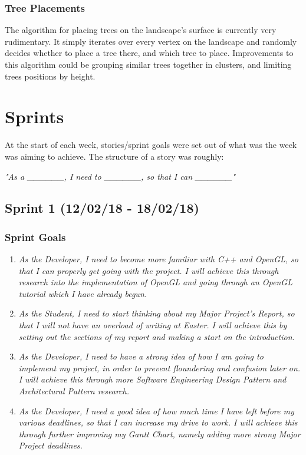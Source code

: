 \documentclass[a4paper,10pt]{report}
\begin{document}
\subsection{Tree Placements}
The algorithm for placing trees on the landscape's surface is currently very rudimentary. It simply iterates over every vertex on the landscape and randomly decides whether to place a tree there, and which tree to place. Improvements to this algorithm could be grouping similar trees together in clusters, and limiting trees positions by height. 



\chapter{Sprints}

At the start of each week, stories/sprint goals were set out of what was the week was aiming to achieve. The structure of a story was roughly:\medskip

\textit{"As a \_\_\_\_\_\_, I need to \_\_\_\_\_\_, so that I can \_\_\_\_\_\_"}

\section{Sprint 1 (12/02/18 - 18/02/18)}

\subsection{Sprint Goals}

\begin{enumerate}
  \item \textit{As the Developer, I need to become more familiar with C++ and OpenGL, so that I can properly get going with the project. I will achieve this through research into the implementation of OpenGL and going through an OpenGL tutorial which I have already begun.}
  
  \item \textit{As the Student, I need to start thinking about my Major Project's Report, so that I will not have an overload of writing at Easter. I will achieve this by setting out the sections of my report and making a start on the introduction.}
  \item \textit{As the Developer, I need to have a strong idea of how I am going to implement my project, in order to prevent floundering and confusion later on. I will achieve this through more Software Engineering Design Pattern and Architectural Pattern research. }
\item \textit{As the Developer, I need a good idea of how much time I have left before my various deadlines, so that I can increase my drive to work. I will achieve this through further improving my Gantt Chart, namely adding more strong Major Project deadlines. }

\end{enumerate}
\end{document}
